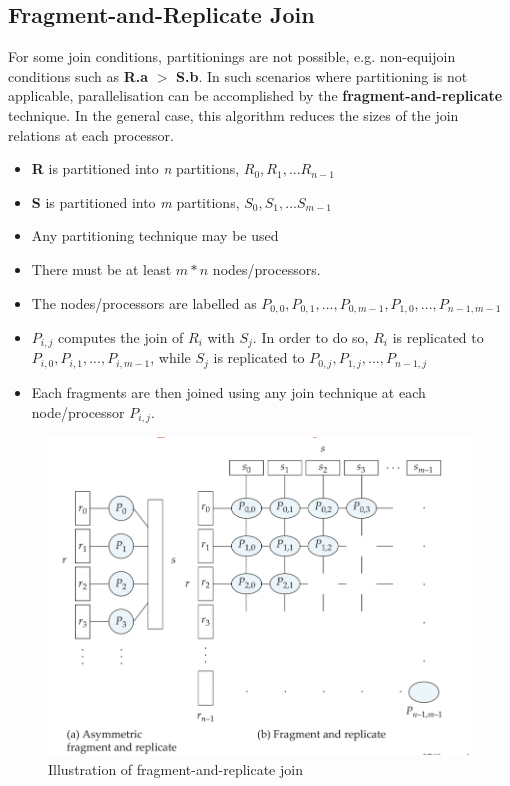 \subsection{Fragment-and-Replicate Join}
For some join conditions, partitionings are not possible, e.g. non-equijoin conditions such as \textbf{R.a} $>$ \textbf{S.b}. In such scenarios where partitioning is not applicable, parallelisation can be accomplished by the \textbf{fragment-and-replicate} technique. In the general case, this algorithm reduces the sizes of the join relations at each processor. 
\begin{itemize}
    \item \textbf{R} is partitioned into \textit{n} partitions, $R_0,R_1,...R_{n-1}$
    \item \textbf{S} is partitioned into \textit{m} partitions, $S_0,S_1,...S_{m-1}$
    \item Any partitioning technique may be used
    \item There must be at least $m*n$ nodes/processors.
    \item The nodes/processors are labelled as $P_{0,0},P_{0,1},...,P_{0,m-1},P_{1,0},...,P_{n-1,m-1}$
    \item $P_{i,j}$ computes the join of $R_i$ with $S_j$. In order to do so, $R_i$ is replicated to $P_{i,0},P_{i,1},...,P_{i,m-1}$, while $S_j$ is replicated to $P_{0,j},P_{1,j},...,P_{n-1,j}$
    \item Each fragments are then joined using any join technique at each node/processor $P_{i,j}$.
\end{itemize}

\begin{figure}[h]
  \centering
  \includegraphics[width=\linewidth]{figures/fragment-replicate-join.png}
  \caption{Illustration of fragment-and-replicate join \cite{DBLP:books/mg/SKS20}}
  \label{fig:fragment-and-replicate-join}
\end{figure}

